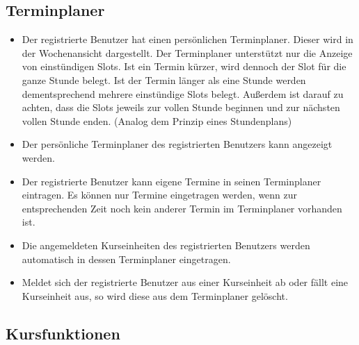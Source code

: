 \documentclass[a4paper]{scrreprt}
\begin{document}
\subsection{Terminplaner}
\begin{itemize}
	\item {}
	Der registrierte Benutzer hat einen persönlichen Terminplaner. Dieser wird in der Wochenansicht dargestellt. Der Terminplaner unterstützt nur die Anzeige von einstündigen Slots. Ist ein Termin kürzer, wird dennoch der Slot für die ganze Stunde belegt. Ist der Termin länger als eine Stunde werden dementsprechend mehrere einstündige Slots belegt.
	Außerdem ist darauf zu achten, dass die Slots jeweils zur vollen Stunde beginnen und zur nächsten vollen Stunde enden. (Analog dem Prinzip eines Stundenplans)
	\item {}
	Der persönliche Terminplaner des registrierten Benutzers kann angezeigt werden. 
	\item {} 
	Der registrierte Benutzer kann eigene Termine in seinen Terminplaner eintragen. Es können nur Termine eingetragen werden, wenn zur entsprechenden Zeit noch kein anderer Termin im Terminplaner vorhanden ist. 
	\item {}
	Die angemeldeten Kurseinheiten des registrierten Benutzers werden automatisch in dessen Terminplaner eingetragen.
	\item {}	
	Meldet sich der registrierte Benutzer aus einer Kurseinheit ab oder fällt eine Kurseinheit aus, so wird diese aus dem Terminplaner gelöscht.
\end{itemize}   
\subsection{Kursfunktionen}
\end{document}
